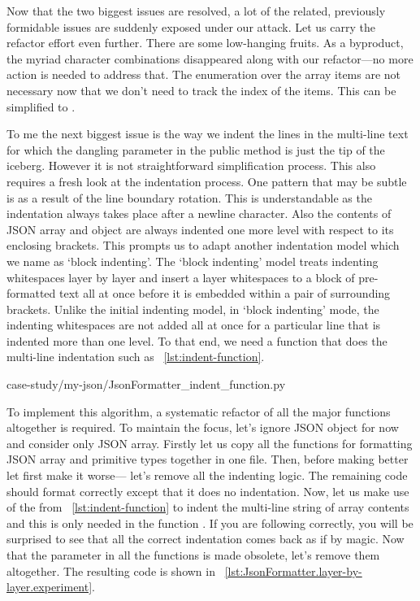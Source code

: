 Now that the two biggest issues are resolved, a lot of the related,
previously formidable issues are suddenly exposed under our attack.
Let us carry the refactor effort even further.
There are some low-hanging fruits.
As a byproduct, the myriad character combinations disappeared along with our
refactor---no more action is needed to address that.
The enumeration 
over the array items are not necessary now that we don't need to track the
index of the items.
This can be simplified to .

To me the next biggest issue is the way we indent the lines in the multi-line text
for which the dangling parameter  in the public method 
is just the tip of the iceberg.
However it is not straightforward simplification process.
This also requires a fresh look at the indentation process.
One pattern that may be subtle is  as a result of the line
boundary rotation.
This is understandable as the indentation always takes place after a newline character.
Also the contents of JSON array and object are always indented one more level with respect to its
enclosing brackets.
This prompts us to adapt another indentation model which we name as `block indenting'.
The `block indenting' model treats indenting whitespaces layer by layer and
insert a layer whitespaces to a block of pre-formatted text all at once before it is embedded
within a pair of surrounding brackets.
Unlike the initial indenting model, in `block indenting' mode,
the indenting whitespaces are not added all at once for
a particular line that is indented more than one level.
To that end, we need a function that does the multi-line indentation
such as ~\autoref{lst:indent-function}.


{case-study/my-json/JsonFormatter_indent_function.py}

To implement this algorithm, a systematic refactor of all the major functions altogether
is required.
To maintain the focus, let's ignore JSON object for now and consider only JSON array.
Firstly let us copy all the functions for formatting JSON array and primitive types together in
one file.
Then, before making better let first make it worse---
let's remove all the indenting logic.
The remaining code should format correctly except that it does no indentation.
Now, let us make use of the  from
~\autoref{lst:indent-function} to indent the multi-line string of array contents and
this is only needed in the function .
If you are following correctly, you will be surprised to see that all the correct indentation comes
back as if by magic.
Now that the parameter  in all the functions is made obsolete, let's remove them
altogether.
The resulting code is shown in ~\autoref{lst:JsonFormatter.layer-by-layer.experiment}.


